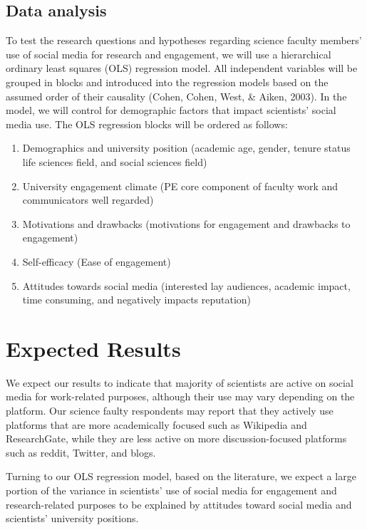 \documentclass[12pt,]{article}
\providecommand{\tightlist}{%
  \setlength{\itemsep}{0pt}\setlength{\parskip}{0pt}}
\begin{document}
\hypertarget{data-analysis}{%
\subsection{Data analysis}\label{data-analysis}}

To test the research questions and hypotheses regarding science faculty members' use of social media for research and engagement, we will use a hierarchical ordinary least squares (OLS) regression model. All independent variables will be grouped in blocks and introduced into the regression models based on the assumed order of their causality (Cohen, Cohen, West, \& Aiken, 2003). In the model, we will control for demographic factors that impact scientists' social media use. The OLS regression blocks will be ordered as follows:

\begin{enumerate}
\def\labelenumi{\arabic{enumi}.}
\tightlist
\item
  Demographics and university position (academic age, gender, tenure status life sciences field, and social sciences field)
\item
  University engagement climate (PE core component of faculty work and communicators well regarded)
\item
  Motivations and drawbacks (motivations for engagement and drawbacks to engagement)
\item
  Self-efficacy (Ease of engagement)
\item
  Attitudes towards social media (interested lay audiences, academic impact, time consuming, and negatively impacts reputation)
\end{enumerate}

\hypertarget{expected-results}{%
\section{Expected Results}\label{expected-results}}

We expect our results to indicate that majority of scientists are active on social media for work-related purposes, although their use may vary depending on the platform. Our science faulty respondents may report that they actively use platforms that are more academically focused such as Wikipedia and ResearchGate, while they are less active on more discussion-focused platforms such as reddit, Twitter, and blogs.

Turning to our OLS regression model, based on the literature, we expect a large portion of the variance in scientists' use of social media for engagement and research-related purposes to be explained by attitudes toward social media and scientists' university positions.
\end{document}
